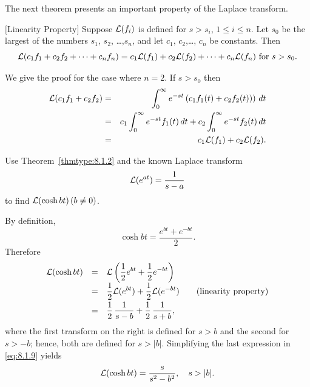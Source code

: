 \noindent
The next theorem presents an important property of the Laplace transform.

\begin{theorem}
  \color{blue}
  $[$Linearity Property$]$\label{thmtype:8.1.2} Suppose ${\cal L}(f_{i})$ is defined for $s>s_{i}$,
  $1\le i\le n$. Let $s_{0}$ be the largest of the numbers $s_{1}$, $s_{2}$, \dots,$s_{n}$, and let
  $c_{1}$, $c_{2}$,\dots, $c_{n}$ be constants. Then
  \[
    {\cal L}(c_{1}f_{1}+c_{2}f_{2}+\cdots+c_{n}f_{n})=c_{1}{\cal L}(f_{1})+c_{2}{\cal L}(f_{2}) +\cdots+c_{n}{\cal L}(f_{n})\mbox{ for }s>s_{0}.
  \]
\end{theorem}

\proof We give the proof for the case where $n=2$. If $s>s_{0}$ then
\begin{eqnarray*}
  {\cal L}(c_{1}f_{1}+c_{2}f_{2}) & = & \int_{0}^{\infty}e^{-st}\left(c_{1}f_{1}(t)+c_{2}f_{2}(t))\right)\,dt               \\
                                  & = & c_{1}\int_{0}^{\infty}e^{-st}f_{1}(t)\,dt+c_{2}\int_{0}^{\infty}e^{-st}f_{2}(t)\,dt \\
                                  & = & c_{1}{\cal L}(f_{1})+c_{2}{\cal L}(f_{2}).
\end{eqnarray*}

\begin{example}
  \label{example:8.1.6}\rm Use Theorem~\ref{thmtype:8.1.2} and the known Laplace transform
  \[
    {\cal L}(e^{at})=\frac{1}{s-a}
  \]
  to find ${\cal L}(\cosh bt)\,(b\ne0)$.
\end{example}

\begin{examplesolution}
\solution By definition,
\[
  \cosh bt=\frac{e^{bt}+e^{-bt}}{2}.
\]
Therefore
\begin{equation}
  \label{eq:8.1.9}
  \begin{array}{ccl}
    {\cal L}(\cosh bt) & = & {\cal L}\left(\displaystyle\frac{1}{2}e^{bt}+\displaystyle\frac{1}{2}e^{-bt}\right)                                   \\[2\jot]
                       & = & \displaystyle\frac{1}{2}{\cal L}(e^{bt})+\displaystyle\frac{1}{2}{\cal L}(e^{-bt}) \qquad \hbox{(linearity property)} \\[2\jot]
                       & = & \displaystyle\frac{1}{2}\,\displaystyle\frac{1}{s-b}+\displaystyle\frac{1}{2}\,\displaystyle\frac{1}{s+b},
  \end{array}
\end{equation}
where the first transform on the right is defined for $s>b$ and the second for $s>-b$; hence, both
are defined for $s>|b|$. Simplifying the last expression in \eqref{eq:8.1.9} yields
\[
  {\cal L}(\cosh bt)=\frac{s}{s^{2}-b^{2}},\quad s>|b|.
\]
\end{examplesolution}

